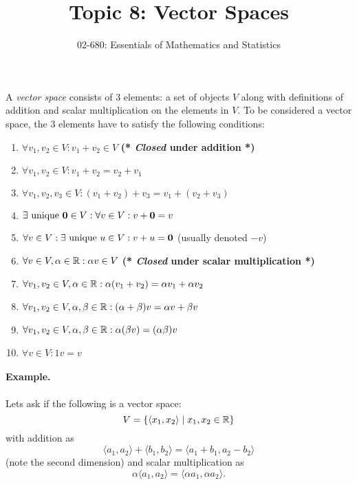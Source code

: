 


\title{Topic 8: Vector Spaces}
\author{02-680: Essentials of Mathematics and Statistics}


\maketitle

A \emph{vector space} consists of 3 elements: 
a set of objects $V$ along with definitions of addition and scalar multiplication on the elements in $V$. 
To be considered a vector space, the 3 elements have to satisfy the following conditions: 
\begin{enumerate}
\item $\forall v_1,v_2 \in V : v_1+v_2 \in V$ \textbf{(* \emph{Closed} under addition *)}
\item $\forall v_1,v_2 \in V : v_1 + v_2 = v_2 + v_1$
\item $\forall v_1,v_2,v_3 \in V : (v_1 + v_2) + v_3 = v_1 + (v_2 + v_3)$
\item $\exists \textnormal{ unique }\mathbf{0} \in V : \forall v \in V : v + \mathbf{0} = v$ 
\item $\forall v \in V : \exists \textnormal{ unique }u \in V : v + u = \mathbf{0}$ (usually denoted $-v$)
\item $\forall v\in V, \alpha \in \operatorname{\mathbb{R}}: \alpha v \in V$ \textbf{(* \emph{Closed} under scalar multiplication *)}
\item $\forall v_1,v_2\in V, \alpha \in \operatorname{\mathbb{R}}: \alpha (v_1 + v_2) = \alpha v_1 + \alpha v_2$
\item $\forall v_1,v_2\in V, \alpha,\beta \in \operatorname{\mathbb{R}}: (\alpha+\beta) v = \alpha v + \beta v$
\item $\forall v_1,v_2\in V, \alpha,\beta \in \operatorname{\mathbb{R}}: \alpha(\beta v) = (\alpha\beta) v$
\item$\forall v \in V : 1v = v$ 
\end{enumerate} 

\paragraph{Example.} 
Lets ask if the following is a vector space: 
\[V = \left\{\left\langle x_1, x_2\right\rangle \mid x_1,x_2 \in \operatorname{\mathbb{R}} \right\}\]
with addition as 
\[ \langle a_1,a_2\rangle + \langle b_1, b_2\rangle = \langle a_1+b_1, a_2-b_2\rangle\]
(note the second dimension)
and scalar multiplication as 
\[\alpha \langle a_1,a_2\rangle = \langle \alpha a_1, \alpha a_2\rangle.\]


